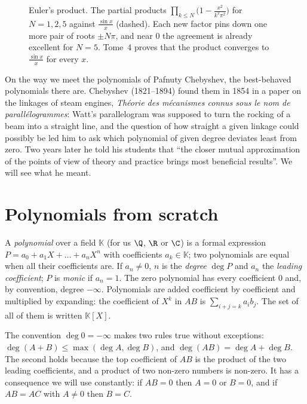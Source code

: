\begin{figure}[ht]
\centering
{}
\caption{Euler's product. The partial products $\prod_{k\le N}\bigl(1-\frac{x^2}{k^2\pi^2}\bigr)$ for $N=1,2,5$ against $\frac{\sin x}x$ (dashed).
Each new factor pins down one more pair of roots $\pm N\pi$, and near $0$ the agreement is already excellent for $N=5$. Tome~4 proves that the product converges to $\frac{\sin x}x$ for every $x$.}
\label{fig:sineprod}
\end{figure}

On the way we meet the polynomials of Pafnuty Chebyshev, the best-behaved polynomials there are. Chebyshev (1821--1894) found them in 1854 in a
paper on the linkages of steam engines, \emph{Th\'eorie des m\'ecanismes connus sous le nom de parall\'elogrammes}: Watt's parallelogram was
supposed to turn the rocking of a beam into a straight line, and the question of how straight a given linkage could possibly be led him to ask
which polynomial of given degree deviates least from zero. Two years later he told his students that ``the closer mutual approximation of the
points of view of theory and practice brings most beneficial results''. We will see what he meant.


\section{Polynomials from scratch}

\begin{definitionx}
A \emph{polynomial} over a field $\mathbb K$ (for us $\Q$, $\R$ or $\C$) is a formal expression $P=a_0+a_1X+\dots+a_nX^n$ with coefficients
$a_k\in\mathbb K$; two polynomials are equal when all their coefficients are. If $a_n\ne0$, $n$ is the \emph{degree} $\deg P$ and $a_n$ the
\emph{leading coefficient}; $P$ is \emph{monic} if $a_n=1$. The zero polynomial has every coefficient $0$ and, by convention, degree $-\infty$.
Polynomials are added coefficient by coefficient and multiplied by expanding: the coefficient of $X^k$ in $AB$ is $\sum_{i+j=k}a_ib_j$.
The set of all of them is written $\mathbb K[X]$.
\end{definitionx}

The convention $\deg0=-\infty$ makes two rules true without exceptions: $\deg(A+B)\le\max(\deg A,\deg B)$, and $\deg(AB)=\deg A+\deg B$. The second
holds because the top coefficient of $AB$ is the product of the two leading coefficients, and a product of two non-zero numbers is non-zero. It has a
consequence we will use constantly: if $AB=0$ then $A=0$ or $B=0$, and if $AB=AC$ with $A\ne0$ then $B=C$.

